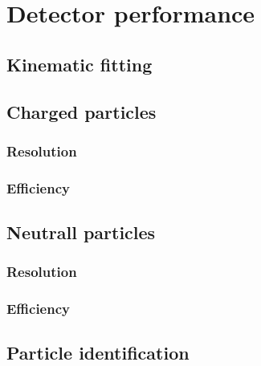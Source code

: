 
\section{Detector performance \label{sec:performance}}
\subsection{Kinematic fitting \label{sec:perffitting}}
\subsection{Charged particles \label{sec:perfcharged}}
\subsubsection{Resolution \label{sec:perfchargedresol}}
\subsubsection{Efficiency \label{sec:perfchargedeff}}
\subsection{Neutrall particles \label{sec:perfneutral}}
\subsubsection{Resolution \label{sec:perfneutralresol}}
\subsubsection{Efficiency \label{sec:perfneutraleff}}
\subsection{Particle identification \label{sec:perfpid}}
